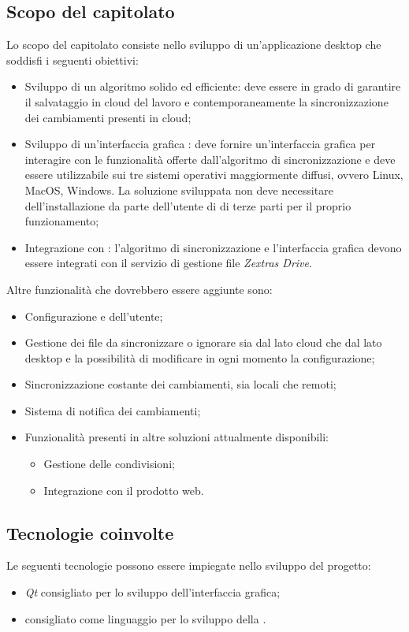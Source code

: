 \subsection{Scopo del capitolato}
Lo scopo del capitolato consiste nello sviluppo di un'applicazione desktop che soddisfi i seguenti obiettivi:
\begin{itemize}
	\item Sviluppo di un algoritmo solido ed efficiente: deve essere in grado di garantire il salvataggio in cloud del lavoro e contemporaneamente la sincronizzazione dei cambiamenti presenti in cloud;
	\item Sviluppo di un’interfaccia grafica : deve fornire un'interfaccia grafica per interagire con le funzionalità offerte dall'algoritmo di sincronizzazione e deve essere utilizzabile sui tre sistemi operativi maggiormente diffusi, ovvero Linux, MacOS, Windows. La soluzione sviluppata non deve necessitare dell'installazione da parte dell'utente di  di terze parti per il proprio funzionamento;
	\item Integrazione con \textit{}: l'algoritmo di sincronizzazione e l'interfaccia grafica devono essere integrati con il servizio di gestione file \textit{Zextras Drive}.
\end{itemize}
Altre funzionalità che dovrebbero essere aggiunte sono:
\begin{itemize}
	\item Configurazione e  dell'utente;
	\item Gestione dei file da sincronizzare o ignorare sia dal lato cloud che dal lato desktop e la possibilità di modificare in ogni momento la configurazione;
	\item Sincronizzazione costante dei cambiamenti, sia locali che remoti;
	\item Sistema di notifica dei cambiamenti;
	\item Funzionalità presenti in altre soluzioni attualmente disponibili:
	\begin{itemize}
		\item Gestione delle condivisioni;
		\item Integrazione con il prodotto web.
	\end{itemize}
\end{itemize}

\subsection{Tecnologie coinvolte}
Le seguenti tecnologie possono essere impiegate nello sviluppo del progetto:
\begin{itemize}
	\item {} \textit{Qt} consigliato per lo sviluppo dell'interfaccia grafica;
	\item \textit{} consigliato come linguaggio per lo sviluppo della .
\end{itemize}

